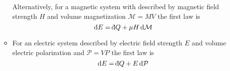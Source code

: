 \documentclass[11pt, a4paper]{article}
\newcommand{\diff}{\mathop{}\!\mathrm{d}} %
\newcommand{\dbar}{{\mathchar '26\mkern -11mu \mathrm{d}}} %
\begin{document}
\begin{itemize}
\begin{itemize}
		Alternatively, for a magnetic system with described by magnetic field strength $ H $ and volume magnetization $ \mathcal{M} = MV $ the first law is
		\begin{equation*}
			\diff E = \dbar Q + \mu H \diff \mathcal{M}
		\end{equation*}
		
		\item For an electric system described by electric field strength $ E $ and volume electric polarization and $ \mathcal{P} = VP $ the first law is
		\begin{equation*}
			\diff E = \dbar Q + E \diff \mathcal{P}
		\end{equation*}
	\end{itemize}
	
\end{itemize}
\end{document}
